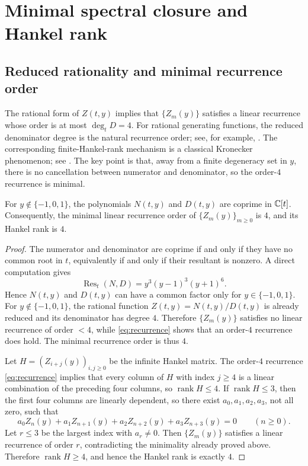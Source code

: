 \section{Minimal spectral closure and Hankel rank}\label{sec:hankel}

\subsection{Reduced rationality and minimal recurrence order}

The rational form of \(Z(t,y)\) implies that \(\{Z_m(y)\}\) satisfies a linear recurrence whose order is at most \(\deg_t D=4\).
For rational generating functions, the reduced denominator degree is the natural recurrence order; see, for example, \cite{Stanley2012,FlajoletSedgewick2009}.
The corresponding finite-Hankel-rank mechanism is a classical Kronecker phenomenon; see \cite[Chap.~3]{Partington1989}.
The key point is that, away from a finite degeneracy set in \(y\), there is no cancellation between numerator and denominator, so the order-\(4\) recurrence is minimal.

\begin{theorem}\label{thm:minimal-order}
For \(y\notin\{-1,0,1\}\), the polynomials \(N(t,y)\) and \(D(t,y)\) are coprime in \(\mathbb{C}[t]\).
Consequently, the minimal linear recurrence order of \(\{Z_m(y)\}_{m\ge 0}\) is \(4\), and its Hankel rank is \(4\).
\end{theorem}

\begin{proof}
The numerator and denominator are coprime if and only if they have no common root in \(t\), equivalently if and only if their resultant is nonzero.
A direct computation gives
\begin{equation}\label{eq:ND-resultant}
\operatorname{Res}_t(N,D)=y^3(y-1)^3(y+1)^6.
\end{equation}
Hence \(N(t,y)\) and \(D(t,y)\) can have a common factor only for \(y\in\{-1,0,1\}\).
For \(y\notin\{-1,0,1\}\), the rational function \(Z(t,y)=N(t,y)/D(t,y)\) is already reduced and its denominator has degree \(4\).
Therefore \(\{Z_m(y)\}\) satisfies no linear recurrence of order \(<4\), while \eqref{eq:recurrence} shows that an order-\(4\) recurrence does hold.
The minimal recurrence order is thus \(4\).

Let \(H=(Z_{i+j}(y))_{i,j\ge 0}\) be the infinite Hankel matrix.
The order-\(4\) recurrence \eqref{eq:recurrence} implies that every column of \(H\) with index \(j\ge 4\) is a linear combination of the preceding four columns, so \(\operatorname{rank} H\le 4\).
If \(\operatorname{rank} H\le 3\), then the first four columns are linearly dependent, so there exist \(a_0,a_1,a_2,a_3\), not all zero, such that
\[
a_0 Z_n(y)+a_1 Z_{n+1}(y)+a_2 Z_{n+2}(y)+a_3 Z_{n+3}(y)=0
\qquad (n\ge 0).
\]
Let \(r\le 3\) be the largest index with \(a_r\neq 0\).
Then \(\{Z_m(y)\}\) satisfies a linear recurrence of order \(r\), contradicting the minimality already proved above.
Therefore \(\operatorname{rank} H\ge 4\), and hence the Hankel rank is exactly \(4\).
\end{proof}

